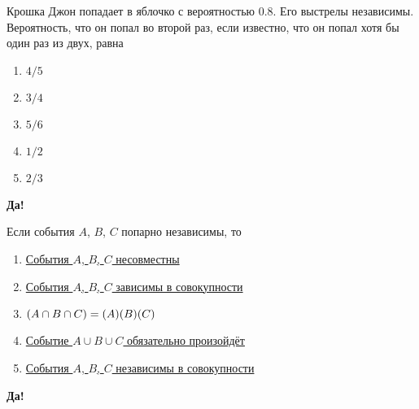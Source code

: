 \documentclass[t]{beamer}
\let\P\relax
\DeclareMathOperator{\P}{\mathbb{P}}
\begin{document}
 \begin{frame} \label{4-Yes} 
\begin{block}{4} 

Крошка Джон попадает в яблочко с вероятностью $0.8$. Его выстрелы независимы. Вероятность, что он попал во второй раз, если известно, что он попал хотя бы один раз из двух, равна


 \end{block} 
\begin{enumerate} 
\item[] \hyperlink{4-No}{\beamergotobutton{} $4/5$}
\item[] \hyperlink{4-No}{\beamergotobutton{} $3/4$}
\item[] \hyperlink{4-Yes}{\beamergotobutton{} $5/6$}
\item[] \hyperlink{4-No}{\beamergotobutton{} $1/2$}
\item[] \hyperlink{4-No}{\beamergotobutton{} $2/3$}
\end{enumerate} 

 \textbf{Да!} 
 \hyperlink{5}{}\end{frame} 


 \begin{frame} \label{5-Yes} 
\begin{block}{5} 

Если события $A$, $B$, $C$ попарно независимы, то


 \end{block} 
\begin{enumerate} 
\item[] \hyperlink{5-No}{\beamergotobutton{} События $A$, $B$, $C$ несовместны}
\item[] \hyperlink{5-No}{\beamergotobutton{} События $A$, $B$, $C$ зависимы в совокупности}
\item[] \hyperlink{5-No}{\beamergotobutton{} $\P(A\cap B\cap C)=\P(A)\P(B)\P(C)$
}
\item[] \hyperlink{5-No}{\beamergotobutton{} Событие $A\cup B\cup C$ обязательно произойдёт}
\item[] \hyperlink{5-No}{\beamergotobutton{} События $A$, $B$, $C$ независимы в совокупности}
\end{enumerate} 

 \textbf{Да!} 
 \hyperlink{6}{}\end{frame} 
\end{document}
